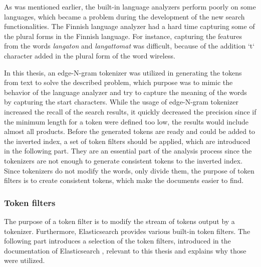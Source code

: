 As was mentioned earlier, the built-in language analyzers perform poorly on some languages, which became
a problem during the development of the new search functionalities.
The Finnish language analyzer had a hard time capturing some of the plural forms in the Finnish language.
For instance, capturing the features from the words \emph{langaton} and \emph{langattomat} was difficult,
because of the addition `t` character added in the plural form of the word wireless.

In this thesis, an edge-N-gram tokenizer was utilized in generating the tokens from text to solve the described problem,
which purpose was to mimic the behavior of the language analyzer and try to capture the meaning of the words
by capturing the start characters.
While the usage of edge-N-gram tokenizer increased the recall of the search results, 
it quickly decreased the precision since if the minimum length for a token were defined too low,
the results would include almost all products.
Before the generated tokens are ready and could be added to the inverted index, a set of token filters
should be applied, which are introduced in the following part.
They are an essential part of the analysis process since the tokenizers are not enough to generate
consistent tokens to the inverted index.
Since tokenizers do not modify the words, only divide them, the purpose of token filters is
to create consistent tokens, which make the documents easier to find.


\subsubsection{Token filters}

The purpose of a token filter is to modify the stream of tokens output by a tokenizer.
Furthermore, Elasticsearch provides various built-in token filters. 
The following part introduces a selection of the token filters, introduced in the documentation of 
Elasticsearch \cite{elasticIntro}, relevant to this thesis and explains why those were utilized.

